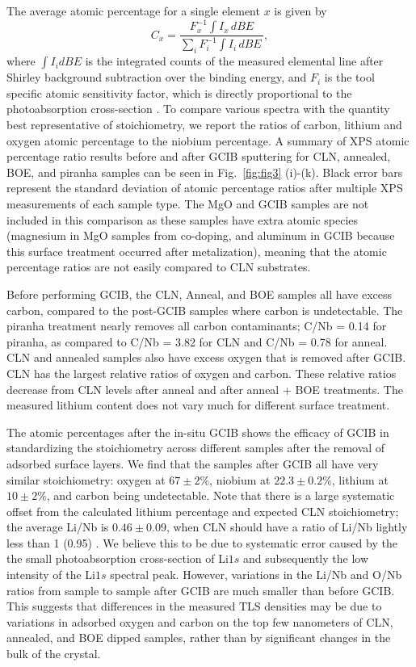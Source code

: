 \documentclass[
 prapplied,
 amsmath,amssymb,
 reprint, longbibliography, superscriptaddress
]{revtex4-2}
\begin{document}
The average atomic percentage for a single element $x$ is given by 
\begin{equation}
C_{x} = \frac{F_x^{-1}\displaystyle\int I_x \, dBE}{ \displaystyle\sum_i F_{i}^{-1} \displaystyle\int I_{i} \, dBE \, }, 
\end{equation}
where $\int I_i dBE$ is the integrated counts of the measured elemental line after Shirley background subtraction over the binding energy, and $F_i$ is the tool specific atomic sensitivity factor, which is directly proportional to the photoabsorption cross-section \cite{chastain1992handbook}. To compare various spectra with the quantity best representative of stoichiometry, we report the ratios of carbon, lithium and oxygen atomic percentage to the niobium percentage. A summary of XPS atomic percentage ratio results before and after GCIB sputtering for CLN, annealed, BOE, and piranha samples can be seen in Fig.~\ref{fig:fig3} (i)-(k). Black error bars represent the standard deviation of atomic percentage ratios after multiple XPS measurements of each sample type. The MgO and GCIB samples are not included in this comparison as these samples have extra atomic species (magnesium in MgO samples from co-doping, and aluminum in GCIB because this surface treatment occurred after metalization), meaning that the atomic percentage ratios are not easily compared to CLN substrates.

Before performing GCIB, the CLN, Anneal, and BOE samples all have excess carbon, compared to the post-GCIB samples where carbon is undetectable. The piranha treatment nearly removes all carbon contaminants; C/Nb = 0.14 for piranha, as compared to C/Nb = 3.82 for CLN and C/Nb = 0.78 for anneal. CLN and annealed samples also have excess oxygen that is removed after GCIB. CLN has the largest relative ratios of oxygen and carbon. These relative ratios decrease from CLN levels after anneal and after anneal + BOE treatments. The measured lithium content does not vary much for different surface treatment.

The atomic percentages after the in-situ GCIB shows the efficacy of GCIB in standardizing the stoichiometry across different samples after the removal of adsorbed surface layers. We find that the samples after GCIB all have very similar stoichiometry: oxygen at $67 \pm 2 \%$, niobium at $22.3 \pm 0.2 \%$, lithium at $10 \pm 2 \%$, and carbon being undetectable. Note that there is a large systematic offset from the calculated lithium percentage and expected CLN stoichiometry; the average Li/Nb is $0.46 \pm 0.09$, when CLN should have a ratio of Li/Nb lightly less than 1 (0.95) \cite{carruthers1971nonstoichiometry, rauber1978current}. We believe this to be due to systematic error caused by the the small photoabsorption cross-section of Li$1s$ and subsequently the low intensity of the Li$1s$ spectral peak. However, variations in the Li/Nb and O/Nb ratios from sample to sample after GCIB are much smaller than before GCIB. This suggests that differences in the measured TLS densities may be due to variations in adsorbed oxygen and carbon on the top few nanometers of CLN, annealed, and BOE dipped samples, rather than by significant changes in the bulk of the crystal. 
\end{document}
